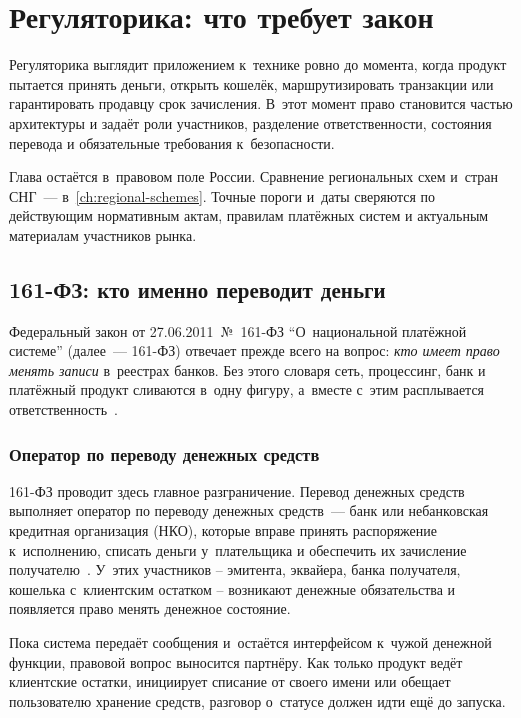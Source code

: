 
\chapter{Регуляторика: что требует закон}\label{ch:regulation}
Регуляторика выглядит приложением к~технике ровно до момента, когда продукт пытается принять деньги, открыть кошелёк, маршрутизировать транзакции или гарантировать продавцу срок зачисления.
В~этот момент право становится частью архитектуры и задаёт роли участников, разделение ответственности, состояния перевода и обязательные требования к~безопасности.

Глава остаётся в~правовом поле России. Сравнение региональных схем и~стран СНГ~--- в~\autoref{ch:regional-schemes}. Точные пороги и~даты сверяются по действующим нормативным актам, правилам платёжных систем и актуальным материалам участников рынка.

\section{161-ФЗ: кто именно переводит деньги}\label{sec:regulation-161fz}

Федеральный закон от 27.06.2011~№~161-ФЗ \enquote{О~национальной платёжной системе} (далее~--- 161-ФЗ) отвечает прежде всего на вопрос: \emph{кто имеет право менять записи} в~реестрах банков.
Без этого словаря сеть, процессинг, банк и платёжный продукт сливаются в~одну фигуру, а~вместе с~этим расплывается ответственность~\cite{fz-161}.

\subsection*{Оператор по переводу денежных средств}

161-ФЗ проводит здесь главное разграничение. Перевод денежных средств выполняет оператор по переводу денежных средств~--- банк или небанковская кредитная организация (НКО), которые вправе принять распоряжение к~исполнению, списать деньги у~плательщика и обеспечить их зачисление получателю~\cite{fz-161}.
У~этих участников -- эмитента, эквайера, банка получателя, кошелька с~клиентским остатком -- возникают денежные обязательства и появляется право менять денежное состояние.

Пока система передаёт сообщения и~остаётся интерфейсом к~чужой денежной функции, правовой вопрос выносится партнёру. Как только продукт ведёт клиентские остатки, инициирует списание от своего имени или обещает пользователю хранение средств, разговор о~статусе должен идти ещё до запуска.

